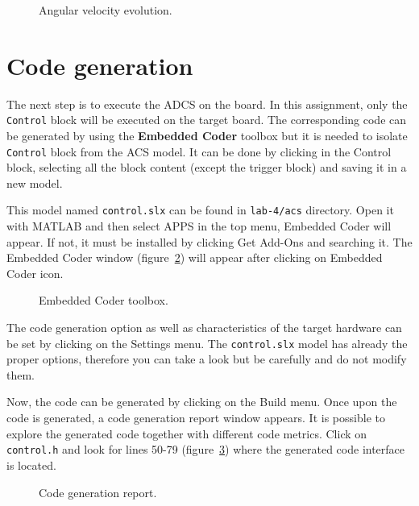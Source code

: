 \begin{figure}[h]
    \caption{Angular velocity evolution.}
    \label{fig:scope}
\end{figure}

\section{Code generation}

The next step is to execute the ADCS on the board.
In this assignment, only the \texttt{Control} block will be executed on the target board.
The corresponding code can be generated by using the \textbf{Embedded Coder} toolbox but it is needed to isolate \texttt{Control} block from the ACS model.
It can be done by clicking in the Control block,
selecting all the block content (except the trigger block)
and saving it in a new model.

This model named \texttt{control.slx} can be found in \textcolor{mPurple}{\texttt{lab-4/acs}} directory.
Open it with MATLAB and then select APPS in the top menu,
Embedded Coder will appear.
If not, it must be installed by clicking Get Add-Ons and searching it.
The Embedded Coder window (figure~\ref{fig:control}) will appear after clicking on Embedded Coder icon.

\begin{figure}[h]
	\caption{Embedded Coder toolbox.}
	\label{fig:control}
\end{figure}

The code generation option as well as characteristics of the target hardware
can be set by clicking on the Settings menu.
The \texttt{control.slx} model has already the proper options,
therefore you can take a look but be carefully and do not modify them.

Now, the code can be generated by clicking on the Build menu.
Once upon the code is generated,
a code generation report window appears.
It is possible to explore the generated code together with different code metrics.
Click on \texttt{control.h} and look for lines 50-79 (figure~\ref{fig:code}) where the generated code interface is located.

\begin{figure}[hbtp!]
    \caption{Code generation report.}
    \label{fig:code}
\end{figure}


